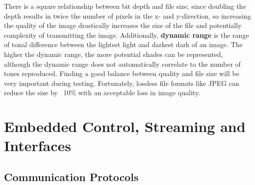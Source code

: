\documentclass[10pt]{article}
\begin{document}
\begin{multicols}{2}
\begin{figure}[H]
\end{figure}
There is a square relationship between bit depth and file size, since doubling the depth results in twice the number of pixels in the x- and y-direction, so increasing the quality of the image drastically increases the size of the file and potentially complexity of transmitting the image.
\newline \newline
Additionally, \textbf{dynamic range} is the range of tonal difference between the lightest light and darkest dark of an image. The higher the dynamic range, the more potential shades can be represented, although the dynamic range does not automatically correlate to the number of tones reproduced.
\newline \newline
Finding a good balance between quality and file size will be very important during testing. Fortunately, lossless file formats like JPEG can reduce the size by ~10\% with an acceptable loss in image quality. 


\section{Embedded Control, Streaming and Interfaces}

\subsection{Communication Protocols}

\end{multicols}
\end{document}
